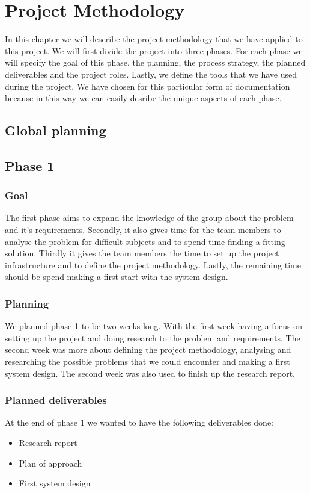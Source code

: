 \chapter{Project Methodology}
In this chapter we will describe the project methodology that we have applied to this project.
We will first divide the project into three phases.
For each phase we will specify the goal of this phase, the planning, the process strategy, the planned deliverables and the project roles.
Lastly, we define the tools that we have used during the project.
We have chosen for this particular form of documentation because in this way we can easily desribe the unique aspects of each phase.

\section{Global planning}


\section{Phase 1}
\subsection{Goal}
The first phase aims to expand the knowledge of the group about the problem and it's requirements.
Secondly, it also gives time for the team members to analyse the problem for difficult subjects and to spend time finding a fitting solution.
Thirdly it gives the team members the time to set up the project infrastructure and to define the project methodology.
Lastly, the remaining time should be spend making a first start with the system design.

\subsection{Planning}
We planned phase 1 to be two weeks long.
With the first week having a focus on setting up the project and doing research to the problem and requirements.
The second week was more about defining the project methodology, analysing and researching the possible problems that we could encounter and making a first system design.
The second week was also used to finish up the research report.
\subsection{Planned deliverables}
At the end of phase 1 we wanted to have the following deliverables done:
\begin{itemize}
\item Research report
\item Plan of approach
\item First system design
\end{itemize}

